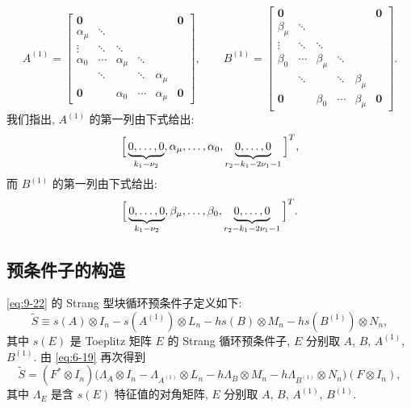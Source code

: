 \[
  A^{(1)}=\begin{bmatrix}
    \mathbf{0} & & & & & \mathbf{0}\\
    \alpha_{\mu} & \ddots & & & & \\
    \vdots & \ddots & \ddots & & & \\
    \alpha_0 & \cdots & \alpha_{\mu} & \ddots & & \\
    & \ddots & & \ddots & \alpha_{\mu} & \\
    \mathbf{0} & & \alpha_0 & \cdots & \alpha_{\mu} & \mathbf{0}
  \end{bmatrix},\qquad
  B^{(1)}=\begin{bmatrix}
    \mathbf{0} & & & & & \mathbf{0}\\
    \beta_{\mu} & \ddots & & & & \\
    \vdots & \ddots & \ddots & & & \\
    \beta_0 & \cdots & \beta_{\mu} & \ddots & & \\
    & \ddots & & \ddots & \beta_{\mu} & \\
    \mathbf{0} & & \beta_0 & \cdots & \beta_{\mu} & \mathbf{0}
  \end{bmatrix}.
\]
我们指出, $A^{(1)}$ 的第一列由下式给出:
\[
  \Bigl[\,\underbrace{0,\ldots,0}_{k_1-\nu_2},\alpha_{\mu},\ldots,\alpha_0,
  \underbrace{0,\ldots,0}_{r_2-k_1-2\nu_1-1}\,\Bigr]^T,
\]
而 $B^{(1)}$ 的第一列由下式给出:
\[
  \Bigl[\,\underbrace{0,\ldots,0}_{k_1-\nu_2},\beta_{\mu},\ldots,\beta_0,
  \underbrace{0,\ldots,0}_{r_2-k_1-2\nu_1-1}\,\Bigr]^T.
\]

\subsection{预条件子的构造}
\label{sec:9-5-2}

\eqref{eq:9-22} 的 Strang 型块循环预条件子定义如下:
\begin{equation}
  \widetilde{S}\equiv s(A)\otimes I_n-s(A^{(1)})\otimes L_n
  -hs(B)\otimes M_n-hs(B^{(1)})\otimes N_n,
  \label{eq:9-23}
\end{equation}
其中 $s(E)$ 是 Toeplitz 矩阵 $E$ 的 Strang 循环预条件子, $E$ 分别取 $A$, $B$, $A^{(1)}$, $B^{(1)}$. 由 \eqref{eq:6-19} 再次得到
\[
  \widetilde{S}=(F^*\otimes I_n)\bigl(\Lambda_A\otimes I_n-\Lambda_{A^{(1)}}\otimes L_n
  -h\Lambda_B\otimes M_n-h\Lambda_{B^{(1)}}\otimes N_n\bigr)(F\otimes I_n),
\]
其中 $\Lambda_E$ 是含 $s(E)$ 特征值的对角矩阵, $E$ 分别取 $A$, $B$, $A^{(1)}$, $B^{(1)}$.

